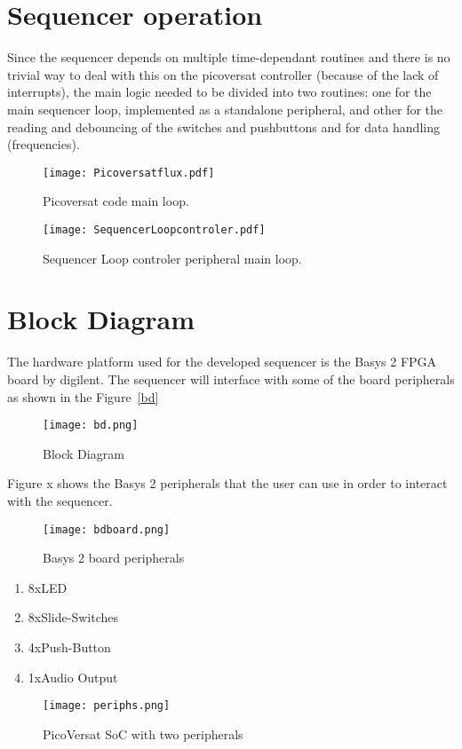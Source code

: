 
\section{Sequencer operation}

Since the sequencer depends on multiple time-dependant routines and there is no trivial way to deal with this on the picoversat controller (because of the lack of interrupts), the main logic needed to be divided into two routines: one for the main sequencer loop, implemented as a standalone peripheral, and other for the reading and debouncing of the switches and pushbuttons and for data handling (frequencies).

\begin{figure}[!htbp]
  \centerline{\texttt{[image: Picoversatflux.pdf]}}
  \vspace{0cm}\caption{Picoversat code main loop.}
  \label{fig:bd}
\end{figure}

\begin{figure}[!htbp]
  \centerline{\texttt{[image: SequencerLoopcontroler.pdf]}}
  \vspace{0cm}\caption{Sequencer Loop controler peripheral main loop.}
  \label{fig:bd}
\end{figure}


\section{Block Diagram}

The hardware platform used for the developed sequencer is the Basys 2 FPGA board by digilent. The sequencer will interface with some of the board peripherals as shown in the Figure~\ref{bd} 

\begin{figure}[!htbp]
    \centerline{\texttt{[image: bd.png]}}
    \vspace{0cm}\caption{Block Diagram}
    \label{fig:bd}
\end{figure}

Figure x shows the Basys 2 peripherals that the user can use in order to interact with the sequencer.

\begin{figure}[!htbp]
  \centerline{\texttt{[image: bdboard.png]}}
  \vspace{0cm}\caption{Basys 2 board peripherals}
  \label{fig:bd}
\end{figure}

\begin{enumerate}
	\item 8xLED
	\item 8xSlide-Switches
	\item 4xPush-Button
	\item 1xAudio Output
\end{enumerate}




\begin{figure}[!htbp]
    \centerline{\texttt{[image: periphs.png]}}
    \vspace{0cm}\caption{PicoVersat SoC with two peripherals}
    \label{fig:periphs}
\end{figure}